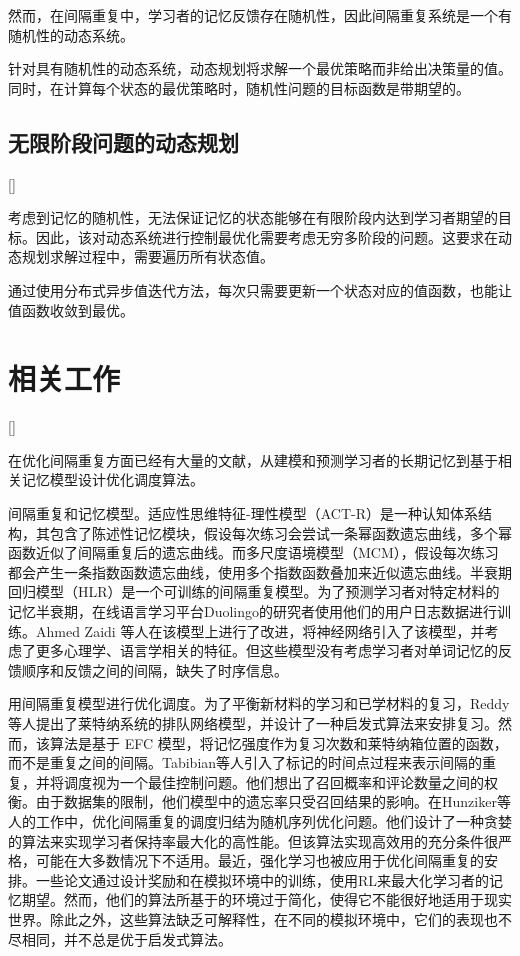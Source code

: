 然而，在间隔重复中，学习者的记忆反馈存在随机性，因此间隔重复系统是一个有随机性的动态系统。

针对具有随机性的动态系统，动态规划将求解一个最优策略而非给出决策量的值。同时，在计算每个状态的最优策略时，随机性问题的目标函数是带期望的。

\subsection{无限阶段问题的动态规划}[]

考虑到记忆的随机性，无法保证记忆的状态能够在有限阶段内达到学习者期望的目标。因此，该对动态系统进行控制最优化需要考虑无穷多阶段的问题。这要求在动态规划求解过程中，需要遍历所有状态值。

通过使用分布式异步值迭代方法，每次只需要更新一个状态对应的值函数，也能让值函数收敛到最优。

\section{相关工作}[]

在优化间隔重复方面已经有大量的文献，从建模和预测学习者的长期记忆到基于相关记忆模型设计优化调度算法。

间隔重复和记忆模型。适应性思维特征-理性模型（ACT-R）\cite{andersonIntegratedTheoryMind2004}是一种认知体系结构，其包含了陈述性记忆模块，假设每次练习会尝试一条幂函数遗忘曲线，多个幂函数近似了间隔重复后的遗忘曲线。而多尺度语境模型（MCM）\cite{pashlerPredictingOptimalSpacing2009}，假设每次练习都会产生一条指数函数遗忘曲线，使用多个指数函数叠加来近似遗忘曲线。半衰期回归模型（HLR）\cite{settlesTrainableSpacedRepetition2016}是一个可训练的间隔重复模型。为了预测学习者对特定材料的记忆半衰期，在线语言学习平台Duolingo的研究者使用他们的用户日志数据进行训练。Ahmed Zaidi 等人\cite{zaidiAdaptiveForgettingCurves2020}在该模型上进行了改进，将神经网络引入了该模型，并考虑了更多心理学、语言学相关的特征。但这些模型没有考虑学习者对单词记忆的反馈顺序和反馈之间的间隔，缺失了时序信息。

用间隔重复模型进行优化调度。为了平衡新材料的学习和已学材料的复习，Reddy等人\cite{reddyUnboundedHumanLearning2016}提出了莱特纳系统\cite{leitnerLerntManLeben1974}的排队网络模型，并设计了一种启发式算法来安排复习。然而，该算法是基于 EFC 模型\cite{reddyUnboundedHumanLearning2016}，将记忆强度作为复习次数和莱特纳箱位置的函数，而不是重复之间的间隔。Tabibian等人\cite{tabibianEnhancingHumanLearning2019}引入了标记的时间点过程来表示间隔的重复，并将调度视为一个最佳控制问题。他们想出了召回概率和评论数量之间的权衡。由于数据集的限制，他们模型中的遗忘率只受召回结果的影响。在Hunziker等人\cite{hunzikerTeachingMultipleConcepts2019}的工作中，优化间隔重复的调度归结为随机序列优化问题。他们设计了一种贪婪的算法来实现学习者保持率最大化的高性能。但该算法实现高效用的充分条件很严格，可能在大多数情况下不适用。最近，强化学习也被应用于优化间隔重复的安排。一些论文\cite{reddyAcceleratingHumanLearning2017,upadhyayDeepReinforcementLearning2018,sinhaUsingDeepReinforcement2019,yangTADSLearningTimeaware2020}通过设计奖励和在模拟环境中的训练，使用RL来最大化学习者的记忆期望。然而，他们的算法所基于的环境过于简化，使得它不能很好地适用于现实世界。除此之外，这些算法缺乏可解释性，在不同的模拟环境中，它们的表现也不尽相同，并不总是优于启发式算法。


